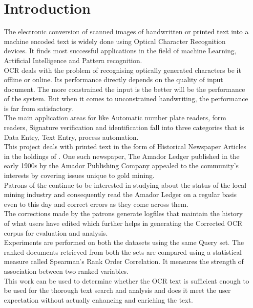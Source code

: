 \documentclass[10pt, conference, compsocconf]{IEEEtran}
\begin{document}
\section{Introduction}
The electronic conversion of scanned images of handwritten or printed text into a machine encoded text is widely done using Optical Character Recognition devices.  It finds most successful applications in the field of machine Learning, Artificial Intelligence and Pattern recognition.\\
OCR deals with the problem of recognising optically generated characters be it offline or online. Its performance directly depends on the quality of input document. The more constrained the input is the better will be the performance of the system. But when it comes to unconstrained handwriting, the performance is far from satisfactory.\\
The main application areas for \cite{OCR} like Automatic number plate readers, form readers, Signature verification and identification fall into three categories that is Data Entry, Text Entry, process automation.\\
This project deals with printed text in the form of Historical Newspaper Articles in the holdings of \cite{cdnc}. One such newspaper, The Amador Ledger published in the early 1900s by the Amador Publishing Company appealed to the community's interests by covering issues unique to gold mining.\\ 
Patrons of the \cite{cdnc} continue to be interested in studying about the status of the local mining industry and consequently read the Amador Ledger on a regular basis even to this day and correct \cite{OCR} errors as they come across them.\\
The corrections made by the patrons generate logfiles that maintain the history of what users have edited which further helps in generating the Corrected OCR corpus for evaluation and analysis.\\
Experiments are performed on both the datasets using the same Query set. The ranked documents retrieved from both the sets are compared using a statistical measure called Spearman's Rank Order Correlation. It measures the strength of association between two ranked variables.\\
This work can be used to determine whether the OCR text is sufficient enough to be used for the thorough text search and analysis and does it meet the user expectation without actually enhancing and enriching the text.\\
\end{document}
